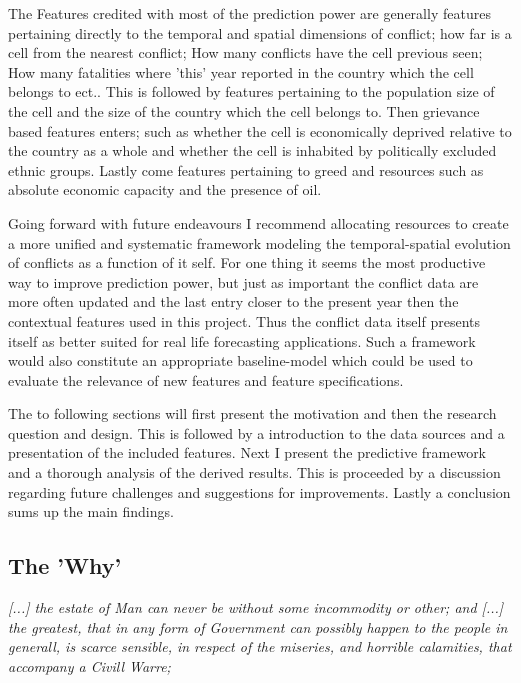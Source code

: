 \documentclass[a4paper]{article}
\begin{document}
The Features credited with most of the prediction power are generally features pertaining directly to the temporal and spatial dimensions of conflict; how far is a cell from the nearest conflict; How many conflicts have the cell previous seen; How many fatalities where 'this' year reported in the country which the cell belongs to ect.. This is followed by features pertaining to the population size of the cell and the size of the country which the cell belongs to. Then grievance based features enters; such as whether the cell is economically deprived relative to the country as a whole and whether the cell is inhabited by politically excluded ethnic groups. Lastly come features pertaining to greed and resources such as absolute economic capacity and the presence of oil.\par


Going forward with future endeavours I recommend allocating resources to create a more unified and systematic framework modeling the temporal-spatial evolution of conflicts as a function of it self. For one thing it seems the most productive way to improve prediction power, but just as important the conflict data are more often updated and the last entry closer to the present year then the contextual features used in this project. Thus the conflict data itself presents itself as better suited for real life forecasting applications. Such a framework would also constitute an appropriate baseline-model which could be used to evaluate the relevance of new features and feature specifications.\par

The to following sections will first present the motivation and then the research question and design. This is followed by a introduction to the data sources and a presentation of the included features. Next I present the predictive framework and a thorough analysis of the derived results. This is proceeded by a discussion regarding future challenges and suggestions for improvements. Lastly a conclusion sums up the main findings.\par

\subsection{The 'Why'}

\begin{displayquote}
\emph{[...] the estate of Man can never be without some incommodity or other; and [...] the greatest, that in any form of Government can possibly happen to the people in generall, is scarce sensible, in respect of the miseries, and horrible calamities, that accompany a Civill Warre;} \cite[128]{Hobbes_1991}  \par

\end{displayquote}
\end{document}
